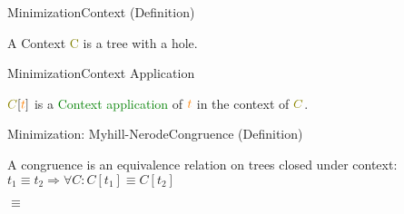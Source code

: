 \documentclass{beamer}
\begin{document}
\begin{frame}{Minimization}{Context (Definition)}
	\begin{definition}
		A Context \textcolor{olive}{C} is a tree with a hole.
	\end{definition}
	\pause
	\begin{center}
	\end{center}
\end{frame}

\begin{frame}{Minimization}{Context Application}
	\begin{definition}
		\(\textcolor{olive}{C}[\textcolor{orange}{t}]\) is a \textcolor{green}{Context application} of \(\textcolor{orange}{t}\) in the context of 	\(\textcolor{olive}{C}\).
	\end{definition}
	\pause
	\begin{center}
	\end{center}
\end{frame}

\begin{frame}{Minimization: Myhill-Nerode}{Congruence (Definition)}
	\begin{definition}
		A congruence is an equivalence relation on trees closed under context:
		\newline
		\(t_1 \equiv t_2 \Rightarrow \forall C: C[t_1] \equiv C[t_2]\)
	\end{definition}
	\pause
	\begin{center}
		\(\equiv\)
	\end{center}
\end{frame}
\end{document}
